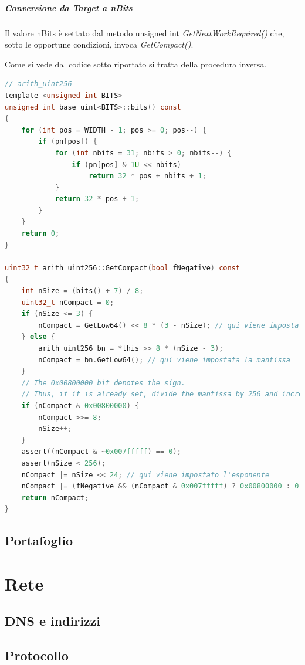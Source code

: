 \documentclass{book}
\theoremstyle{definition}
\begin{document}
\subparagraph{Conversione da Target a nBits}

Il valore nBits è settato dal metodo unsigned int \textit{GetNextWorkRequired()} che,
sotto le opportune condizioni, invoca \textit{GetCompact()}.

Come si vede dal codice sotto riportato si tratta della procedura inversa.

\lstset{style=mystyle}
\begin{lstlisting}[language=c]
// arith_uint256
template <unsigned int BITS>
unsigned int base_uint<BITS>::bits() const
{
    for (int pos = WIDTH - 1; pos >= 0; pos--) {
        if (pn[pos]) {
            for (int nbits = 31; nbits > 0; nbits--) {
                if (pn[pos] & 1U << nbits)
                    return 32 * pos + nbits + 1;
            }
            return 32 * pos + 1;
        }
    }
    return 0;
}

uint32_t arith_uint256::GetCompact(bool fNegative) const
{
    int nSize = (bits() + 7) / 8;
    uint32_t nCompact = 0;
    if (nSize <= 3) {
        nCompact = GetLow64() << 8 * (3 - nSize); // qui viene impostata la mantissa
    } else {
        arith_uint256 bn = *this >> 8 * (nSize - 3);
        nCompact = bn.GetLow64(); // qui viene impostata la mantissa
    }
    // The 0x00800000 bit denotes the sign.
    // Thus, if it is already set, divide the mantissa by 256 and increase the exponent.
    if (nCompact & 0x00800000) {
        nCompact >>= 8;
        nSize++;
    }
    assert((nCompact & ~0x007fffff) == 0);
    assert(nSize < 256);
    nCompact |= nSize << 24; // qui viene impostato l'esponente
    nCompact |= (fNegative && (nCompact & 0x007fffff) ? 0x00800000 : 0); // qui viene impostato il segno
    return nCompact;
}
\end{lstlisting}


\newpage
\subsection{Portafoglio}

\newpage
\section{Rete}
\subsection{DNS e indirizzi}
\subsection{Protocollo}
\end{document}
